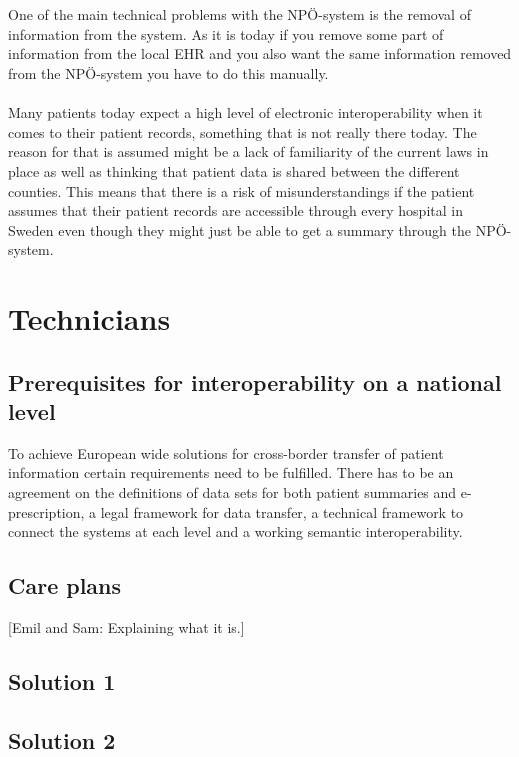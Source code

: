\documentclass[14pt]{article}
\begin{document}
\\\\
One of the main technical problems with the NPÖ-system is the removal of information from the system. As it is today if you remove some part of information from the local \gls{EHR} and you also want the same information removed from the NPÖ-system you have to do this manually.
\\\\
Many patients today expect a high level of electronic \gls{interoperability} when it comes to their patient records\cite{EPJ2}, something that is not really there today. The reason for that is assumed might be a lack of familiarity of the current laws in place as well as thinking that patient data is shared between the different counties. This means that there is a risk of misunderstandings if the patient assumes that their patient records are accessible through every hospital in Sweden even though they might just be able to get a summary through the NPÖ-system.

\section{Technicians}

\subsection{Prerequisites for interoperability on a national level}

To achieve European wide solutions for cross-border transfer of patient information certain requirements need to be fulfilled. There has to be an agreement on the definitions of data sets for both patient summaries and e-prescription, a legal framework for data transfer, a technical framework to connect the systems at each level and a working semantic \gls{interoperability}. \cite{epSOS1}

\subsection{Care plans}
[Emil and Sam: Explaining what it is.]

\subsection{Solution 1}
\subsection{Solution 2}
\end{document}
